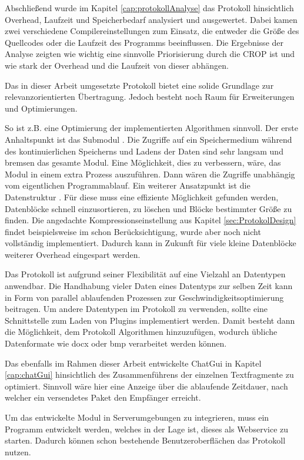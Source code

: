 Abschließend wurde im Kapitel \ref{cap:protokollAnalyse} das Protokoll
hinsichtlich Overhead, Laufzeit und Speicherbedarf analysiert und ausgewertet.
Dabei kamen zwei verschiedene Compilereinstellungen zum Einsatz, die entweder
die Größe des Quellcodes oder die Laufzeit des Programms beeinflussen. Die
Ergebnisse der Analyse zeigten wie wichtig eine sinnvolle Priorisierung durch
die CROP ist und wie stark der Overhead und die Laufzeit von dieser abhängen.

Das in dieser Arbeit umgesetzte Protokoll bietet eine solide
Grundlage zur relevanzorientierten Übertragung. Jedoch besteht noch Raum
für Erweiterungen und Optimierungen.

So ist z.B. eine Optimierung der implementierten Algorithmen sinnvoll.
Der erste Anhaltspunkt ist das Submodul .
Die Zugriffe auf ein Speichermedium während des kontinuierlichen Speicherns und
Ladens der Daten sind sehr langsam und bremsen das gesamte Modul. Eine
Möglichkeit, dies zu verbessern, wäre, das Modul in einem extra Prozess
auszuf{\"u}hren. Dann wären die Zugriffe unabhängig vom eigentlichen
Programmablauf. Ein weiterer Ansatzpunkt ist die Datenstruktur
. Für diese muss eine effiziente Möglichkeit
gefunden werden, Datenblöcke schnell einzusortieren, zu löschen und Bl{\"o}cke
bestimmter Größe zu finden.
Die angedachte Kompressionseinstellung aus Kapitel \ref{sec:ProtokolDesign}
findet beispielsweise im  schon Berücksichtigung, wurde aber
noch nicht vollständig implementiert. Dadurch kann in Zukunft für viele kleine
Datenblöcke weiterer Overhead eingespart werden.

Das Protokoll ist aufgrund seiner Flexibilität auf eine Vielzahl an Datentypen
anwendbar. Die Handhabung vieler Daten eines Datentyps zur selben Zeit kann
in Form von parallel ablaufenden Prozessen zur Geschwindigkeitsoptimierung
beitragen. Um andere Datentypen im Protokoll zu verwenden, sollte eine
Schnittstelle zum Laden von Plugins implementiert werden. Damit besteht dann die
Möglichkeit, dem Protokoll Algorithmen hinzuzufügen, wodurch
übliche Datenformate wie docx oder bmp verarbeitet werden können.

Das ebenfalls im Rahmen dieser Arbeit entwickelte ChatGui in Kapitel
\ref{cap:chatGui} hinsichtlich des Zusammenführens der einzelnen Textfragmente
zu optimiert. Sinnvoll wäre hier eine Anzeige über die ablaufende Zeitdauer,
nach welcher ein versendetes Paket den Empfänger erreicht.

Um das entwickelte Modul in Serverumgebungen zu integrieren, muss ein Programm
entwickelt werden, welches in der Lage ist, dieses als Webservice zu starten.
Dadurch können schon bestehende Benutzeroberflächen das Protokoll nutzen.
